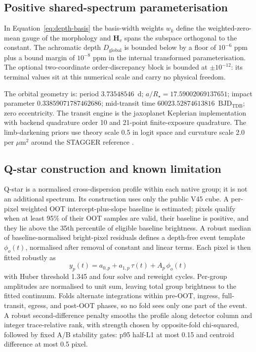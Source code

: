 \subsection{Positive shared-spectrum parameterisation}

In Equation~\ref{eq:depth-basis} the basis-width weights $w_k$ define the
weighted-zero-mean gauge of the morphology and $\bm{H}_v$ spans the
subspace orthogonal to the constant. The achromatic depth
$D_{\mathrm{global}}$ is bounded below by a floor of $10^{-6}$ ppm plus a
bound margin of $10^{-8}$ ppm in the internal transformed
parameterisation. The
optional two-coordinate order-discrepancy block is bounded at
$\pm 10^{-12}$: its terminal values sit at this numerical scale and carry
no physical freedom.

The orbital geometry is: period $3.73548546$~d;
$a/R_\star=17.59002069137651$; impact parameter $0.33859071787462686$;
mid-transit time $60023.52874613816$~$\mathrm{BJD_{TDB}}$; zero
eccentricity. The transit engine is the jaxoplanet Keplerian
implementation \citep{Jaxoplanet2025} with backend quadrature order 10 and
21-point finite-exposure quadrature. The limb-darkening priors use theory
scale 0.5 in logit space and curvature scale 2.0 per $\mu\mathrm{m}^2$
around the STAGGER reference \citep{MagicEtAl2015}.

\subsection{Q-star construction and known limitation}

Q-star is a normalised cross-dispersion profile within each native group;
it is not an additional spectrum. Its construction uses only the public
V45 cube. A per-pixel weighted OOT intercept-plus-slope baseline is
estimated; pixels qualify when at least 95\% of their OOT samples are
valid, their baseline is positive, and they lie above the 35th percentile
of eligible baseline brightness. A robust median of baseline-normalised
bright-pixel residuals defines a depth-free event template $\phi_o(t)$,
normalised after removal of constant and linear terms. Each pixel is then
fitted robustly as
\begin{equation}
 y_p(t)=a_{0,p}+a_{1,p}\,\tau(t)+A_p\,\phi_o(t)
\end{equation}
with Huber threshold 1.345 and four solve and reweight cycles. Per-group
amplitudes are normalised to unit sum, leaving total group brightness to
the fitted continuum. Folds alternate integrations within pre-OOT,
ingress, full-transit, egress, and post-OOT phases, so no fold sees only
one part of the event. A robust second-difference penalty smooths the
profile along detector column and integer trace-relative rank, with
strength chosen by opposite-fold chi-squared, followed by fixed A/B
stability gates: p95 half-L1 at most 0.15 and centroid difference at most
0.5 pixel.

